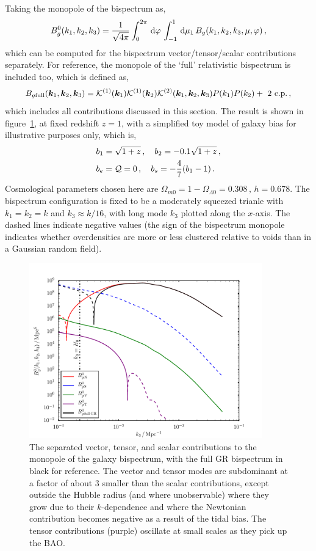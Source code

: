 Taking the monopole of the bispectrum as, 
\begin{equation}
	B_g^0 (k_1,k_2,k_3) = \frac{1}{\sqrt{4\pi}} \int_0^{2\pi}\,\mathrm{d}\varphi\, \int_{-1}^1 \,\mathrm{d}\mu_1\, B_g(k_1, k_2, k_3, \mu, \varphi)\,,
\end{equation}
which can be computed for the bispectrum vector/tensor/scalar contributions separately. For reference, the monopole of the `full' relativistic bispectrum is included too, which is defined as, 
\begin{equation}
	B_{g\mathrm{full}}(\bm {k}_1,\bm {k}_2,\bm {k}_3)= \mathcal{K}^{(1)}(\bm {k}_1) \mathcal{K}^{(1)}(\bm {k}_2) \mathcal{K}^{(2)}(\bm {k}_1,\bm {k}_2,\bm {k}_3) P(k_1) P(k_2) + \text{ 2 c.p.}\,,
\end{equation}
which includes all contributions discussed in this section. The result is shown in figure~\ref{fig:monopolevectortensor}, at fixed redshift $z=1$, with a simplified toy model of galaxy bias for illustrative purposes only, which is,~\cite{Jolicoeur:2017eyi}
\begin{align}
	&b_1 = \sqrt{1 + z}\,, \quad b_2 = -0.1 \sqrt{1 + z}\,,\nonumber \\
	&b_e = \mathcal{Q} = 0\,,\quad b_s = - \frac{4}{7}(b_1 - 1)\,.
\end{align}
Cosmological parameters chosen here are $\Omega_{m0} = 1 - \Omega_{\Lambda0} = 0.308\,,\, h = 0.678$. The bispectrum configuration is fixed to be a moderately squeezed trianle with $k_1 = k_2 = k$ and $k_3 \approx k/16$, with long mode $k_3$ plotted along the $x$-axis. The dashed lines indicate negative values (the sign of the bispectrum monopole indicates whether overdensities are more or less clustered relative to voids than in a Gaussian random field). 

\begin{figure}[ht]
	\centering
	\includegraphics[width=0.9\textwidth]{fig/vectortensor_monopole.pdf}
	\caption{The separated vector, tensor, and scalar contributions to the monopole of the galaxy bispectrum, with the full GR bispectrum in black for reference. The vector and tensor modes are subdominant at a factor of about 3 smaller than the scalar contributions, except outside the Hubble radius (and where unobservable) where they grow due to their $k$-dependence and where the Newtonian contribution becomes negative as a result of the tidal bias. The tensor contributions (purple) oscillate at small scales as they pick up the BAO.}
	\label{fig:monopolevectortensor}
\end{figure}

